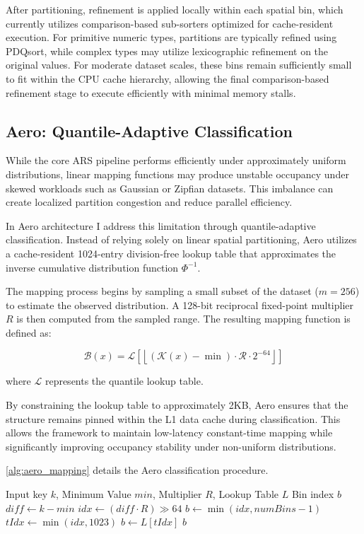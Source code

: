After partitioning, refinement is applied locally within each spatial bin, which currently utilizes comparison-based sub-sorters optimized for cache-resident execution.
For primitive numeric types, partitions are typically refined using PDQsort, while complex types may utilize lexicographic refinement on the original values.
For moderate dataset scales, these bins remain sufficiently small to fit within the CPU cache hierarchy, allowing the final comparison-based refinement stage to execute efficiently with minimal memory stalls.

\subsection{Aero: Quantile-Adaptive Classification}
While the core ARS pipeline performs efficiently under approximately uniform distributions, linear mapping functions may produce unstable occupancy under skewed workloads such as Gaussian or Zipfian datasets.
This imbalance can create localized partition congestion and reduce parallel efficiency.

In Aero architecture I address this limitation through quantile-adaptive classification.
Instead of relying solely on linear spatial partitioning, Aero utilizes a cache-resident 1024-entry division-free lookup table that approximates the inverse cumulative distribution function $\Phi^{-1}$.

The mapping process begins by sampling a small subset of the dataset ($m = 256$) to estimate the observed distribution.
A 128-bit reciprocal fixed-point multiplier $R$ is then computed from the sampled range.
The resulting mapping function is defined as:

\begin{equation}
\mathcal{B}(x) =
\mathcal{L}
\left[
\left\lfloor
 (\mathcal{K}(x) - \min) \cdot \mathcal{R} \cdot 2^{-64}
\right\rfloor
\right]
\end{equation}

where $\mathcal{L}$ represents the quantile lookup table.

By constraining the lookup table to approximately 2KB, Aero ensures that the structure remains pinned within the L1 data cache during classification.
This allows the framework to maintain low-latency constant-time mapping while significantly improving occupancy stability under non-uniform distributions.

\cref{alg:aero_mapping} details the Aero classification procedure.

\begin{algorithm}
\caption{Aero Division-Free Quantile Mapping}
\label{alg:aero_mapping}
\begin{algorithmic}[1]
\REQUIRE Input key $k$, Minimum Value $min$, Multiplier $R$, Lookup Table $L$
\ENSURE Bin index $b$
\STATE $diff \gets k - min$
\STATE $idx \gets (diff \cdot R) \gg 64$
 \STATE $b \gets \min(idx, numBins - 1)$
\ELSE
 \STATE $tIdx \gets \min(idx, 1023)$
 \STATE $b \gets L[tIdx]$
\ENDIF
\RETURN $b$
\end{algorithmic}
\end{algorithm}

